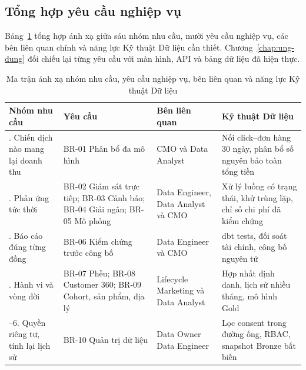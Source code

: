 \subsection{Tổng hợp yêu cầu nghiệp vụ}
\label{sec:c1-br-summary}

Bảng~\ref{tab:br-matrix} tổng hợp ánh xạ giữa sáu nhóm nhu cầu, mười yêu cầu nghiệp vụ, các bên liên quan chính và năng lực Kỹ thuật Dữ liệu cần thiết. Chương~\ref{chap:ung-dung} đối chiếu lại từng yêu cầu với màn hình, API và bảng dữ liệu đã hiện thực.

\begin{table}[H]
\centering
\caption{Ma trận ánh xạ nhóm nhu cầu, yêu cầu nghiệp vụ, bên liên quan và năng lực Kỹ thuật Dữ liệu}
\label{tab:br-matrix}
\small
\renewcommand{\arraystretch}{1.25}
\begin{tabularx}{\textwidth}{>{\raggedright\arraybackslash}p{2.9cm} >{\raggedright\arraybackslash}p{3.4cm} >{\raggedright\arraybackslash}p{2.6cm} >{\raggedright\arraybackslash}X}
\toprule
\textbf{Nhóm nhu cầu} & \textbf{Yêu cầu} & \textbf{Bên liên quan} & \textbf{Kỹ thuật Dữ liệu} \\
\midrule
1. Chiến dịch nào mang lại doanh thu & BR-01 Phân bổ đa mô hình & CMO và Data Analyst & Nối click--đơn hàng 30 ngày, phân bổ số nguyên bảo toàn tổng tiền \\
2. Phản ứng tức thời & BR-02 Giám sát trực tiếp; BR-03 Cảnh báo; BR-04 Giải ngân; BR-05 Mô phỏng & Data Engineer, Data Analyst và CMO & Xử lý luồng có trạng thái, khử trùng lặp, chỉ số chi phí đã kiểm chứng \\
3. Báo cáo đúng từng đồng & BR-06 Kiểm chứng trước công bố & Data Engineer và CMO & dbt tests, đối soát tài chính, công bố nguyên tử \\
4. Hành vi và vòng đời & BR-07 Phễu; BR-08 Customer 360; BR-09 Cohort, sản phẩm, địa lý & Lifecycle Marketing và Data Analyst & Hợp nhất định danh, lịch sử nhiều tháng, mô hình Gold \\
5--6. Quyền riêng tư, tính lại lịch sử & BR-10 Quản trị dữ liệu & Data Owner Data Engineer & Lọc consent trong đường ống, RBAC, snapshot Bronze bất biến \\
\bottomrule
\end{tabularx}
\end{table}
